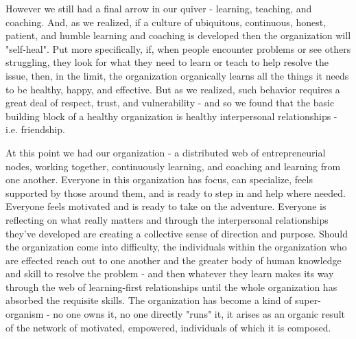 \documentclass[11pt,a5paper]{book}
\begin{document}
However we still had a final arrow in our quiver - learning, teaching, and coaching. And, as we realized, if a culture of ubiquitous, continuous, honest, patient, and humble learning and coaching is developed then the organization will "self-heal". Put more specifically, if, when people encounter problems or see others struggling, they look for what they need to learn or teach to help resolve the issue, then, in the limit, the organization organically learns all the things it needs to be healthy, happy, and effective. But as we realized, such behavior requires a great deal of respect, trust, and vulnerability - and so we found that the basic building block of a healthy organization is healthy interpersonal relationships - i.e. friendship.
\newline

At this point we had our organization - a distributed web of entrepreneurial nodes, working together, continuously learning, and coaching and learning from one another. Everyone in this organization has focus, can specialize, feels supported by those around them, and is ready to step in and help where needed. Everyone feels motivated and is ready to take on the adventure. Everyone is reflecting on what really matters and through the interpersonal relationships they've developed are creating a collective sense of direction and purpose. Should the organization come into difficulty, the individuals within the organization who are effected reach out to one another and the greater body of human knowledge and skill to resolve the problem - and then whatever they learn makes its way through the web of learning-first relationships until the whole organization has absorbed the requisite skills. The organization has become a kind of super-organism - no one owns it, no one directly "runs" it, it arises as an organic result of the network of motivated, empowered, individuals of which it is composed. 
\newline
\end{document}
